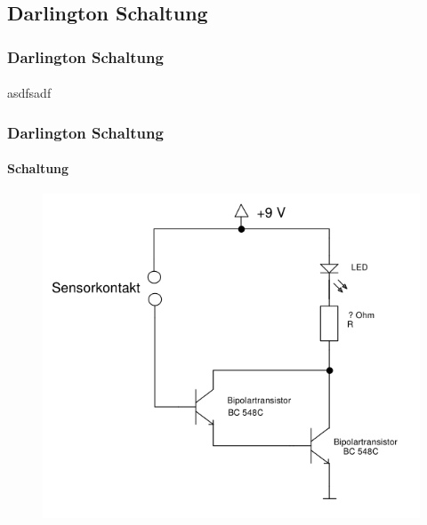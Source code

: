\subsection{Darlington Schaltung} %
\label{sub:Darlington_Schaltung}
\begin{frame}
    \frametitle{Darlington Schaltung}
    \framesubtitle{}
    asdfsadf 
\end{frame}
\begin{frame}
    \frametitle{Darlington Schaltung}
    \framesubtitle{Schaltung}
    \begin{figure}[H]
    \begin{center}
            \includegraphics[scale=0.4]{./img/schaltungen/darlington.png}
    \end{center}
    \end{figure}
    
\end{frame}

